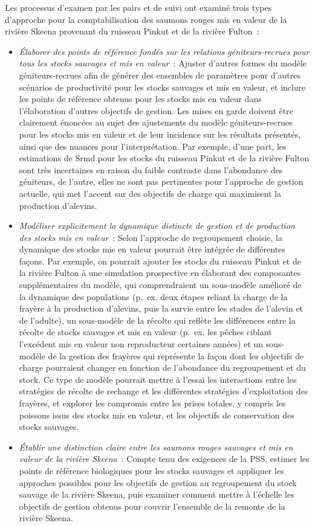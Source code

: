 \documentclass[french,11pt]{book}
\begin{document}
Les processus d'examen par les pairs et de suivi ont examiné trois types d'approche pour la comptabilisation des saumons rouges mis en valeur de la rivière Skeena provenant du ruisseau Pinkut et de la rivière Fulton~:
\begin{itemize}

\item
  \emph{Élaborer des points de référence fondés sur les relations géniteurs-recrues pour tous les stocks sauvages et mis en valeur}~: Ajuster d'autres formes du modèle géniteurs-recrues afin de générer des ensembles de paramètres pour d'autres scénarios de productivité pour les stocks sauvages et mis en valeur, et inclure les points de référence obtenus pour les stocks mis en valeur dans l'élaboration d'autres objectifs de gestion. Les mises en garde doivent être clairement énoncées au sujet des ajustements du modèle géniteurs-recrues pour les stocks mis en valeur et de leur incidence sur les résultats présentés, ainsi que des nuances pour l'interprétation. Par exemple, d'une part, les estimations de Srmd pour les stocks du ruisseau Pinkut et de la rivière Fulton sont très incertaines en raison du faible contraste dans l'abondance des géniteurs, de l'autre, elles ne sont pas pertinentes pour l'approche de gestion actuelle, qui met l'accent sur des objectifs de charge qui maximisent la production d'alevins.
\item
  \emph{Modéliser explicitement la dynamique distincte de gestion et de production des stocks mis en valeur}~: Selon l'approche de regroupement choisie, la dynamique des stocks mis en valeur pourrait être intégrée de différentes façons. Par exemple, on pourrait ajouter les stocks du ruisseau Pinkut et de la rivière Fulton à une simulation prospective en élaborant des composantes supplémentaires du modèle, qui comprendraient un sous-modèle amélioré de la dynamique des populations (p.~ex. deux étapes reliant la charge de la frayère à la production d'alevins, puis la survie entre les stades de l'alevin et de l'adulte), un sous-modèle de la récolte qui reflète les différences entre la récolte de stocks sauvages et mis en valeur (p.~ex. les pêches ciblant l'excédent mis en valeur non reproducteur certaines années) et un sous-modèle de la gestion des frayères qui représente la façon dont les objectifs de charge pourraient changer en fonction de l'abondance du regroupement et du stock. Ce type de modèle pourrait mettre à l'essai les interactions entre les stratégies de récolte de rechange et les différentes stratégies d'exploitation des frayères, et explorer les compromis entre les prises totales, y compris les poissons issus des stocks mis en valeur, et les objectifs de conservation des stocks sauvages.
\item
  \emph{Établir une distinction claire entre les saumons rouges sauvages et mis en valeur de la rivière Skeena}~: Compte tenu des exigences de la PSS, estimer les points de référence biologiques pour les stocks sauvages et appliquer les approches possibles pour les objectifs de gestion au regroupement du stock sauvage de la rivière Skeena, puis examiner comment mettre à l'échelle les objectifs de gestion obtenus pour couvrir l'ensemble de la remonte de la rivière Skeena.
\end{itemize}
\end{document}
